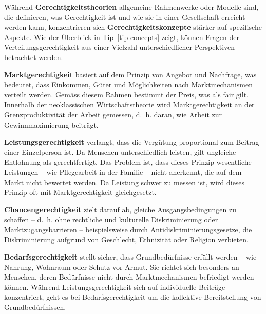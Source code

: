\documentclass[
  nswissgerman,
  a4paper,
  openany]{book}
\newcounter{quartocallouttipno}
\newcommand{\quartocallouttip}[1]{\refstepcounter{quartocallouttipno}\label{#1}}
\begin{document}
Während \textbf{Gerechtigkeitstheorien} allgemeine Rahmenwerke oder
Modelle sind, die definieren, was Gerechtigkeit ist und wie sie in einer
Gesellschaft erreicht werden kann, konzentrieren sich
\textbf{Gerechtigkeitskonzepte} stärker auf spezifische Aspekte. Wie der
Überblick in Tip~\ref{tip-concepts} zeigt, können Fragen der
Verteilungsgerechtigkeit aus einer Vielzahl unterschiedlicher
Perspektiven betrachtet werden.

\begin{tcolorbox}[enhanced jigsaw, arc=.35mm, bottomrule=.15mm, bottomtitle=1mm, breakable, colback=white, colbacktitle=quarto-callout-note-color!10!white, colframe=quarto-callout-note-color-frame, coltitle=black, left=2mm, leftrule=.75mm, opacityback=0, opacitybacktitle=0.6, rightrule=.15mm, title={Hinweis \ref*{tip-concepts}: Normative Gerechtigkeitskonzepte nach
{[}@novyZukunftsfaehigesWirtschaften2023{]}}, titlerule=0mm, toprule=.15mm, toptitle=1mm]

\quartocallouttip{tip-concepts} 

\textbf{Marktgerechtigkeit} basiert auf dem Prinzip von Angebot und
Nachfrage, was bedeutet, dass Einkommen, Güter und Möglichkeiten nach
Marktmechanismen verteilt werden. Gemäss diesem Rahmen bestimmt der
Preis, was als fair gilt. Innerhalb der neoklassischen
Wirtschaftstheorie wird Marktgerechtigkeit an der Grenzproduktivität der
Arbeit gemessen, d.~h. daran, wie Arbeit zur Gewinnmaximierung beiträgt.

\textbf{Leistungsgerechtigkeit} verlangt, dass die Vergütung
proportional zum Beitrag einer Einzelperson ist. Da Menschen
unterschiedlich leisten, gilt ungleiche Entlohnung als gerechtfertigt.
Das Problem ist, dass dieses Prinzip wesentliche Leistungen -- wie
Pflegearbeit in der Familie -- nicht anerkennt, die auf dem Markt nicht
bewertet werden. Da Leistung schwer zu messen ist, wird dieses Prinzip
oft mit Marktgerechtigkeit gleichgesetzt.

\textbf{Chancengerechtigkeit} zielt darauf ab, gleiche
Ausgangsbedingungen zu schaffen -- d.~h. ohne rechtliche und kulturelle
Diskriminierung oder Marktzugangsbarrieren -- beispielsweise durch
Antidiskriminierungsgesetze, die Diskriminierung aufgrund von
Geschlecht, Ethnizität oder Religion verbieten.

\textbf{Bedarfsgerechtigkeit} stellt sicher, dass Grundbedürfnisse
erfüllt werden -- wie Nahrung, Wohnraum oder Schutz vor Armut. Sie
richtet sich besonders an Menschen, deren Bedürfnisse nicht durch
Marktmechanismen befriedigt werden können. Während
Leistungsgerechtigkeit sich auf individuelle Beiträge konzentriert, geht
es bei Bedarfsgerechtigkeit um die kollektive Bereitstellung von
Grundbedürfnissen.


\end{tcolorbox}
\end{document}
